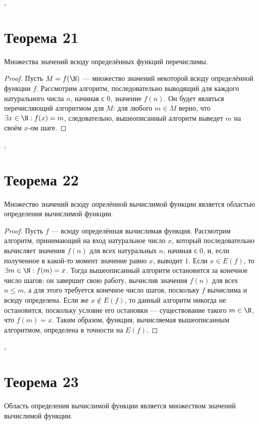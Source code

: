 \documentclass[a4paper,12pt]{article}
\begin{document}
    \sep
    
    \section {Теорема 21}
    \begin{theorem}
    Множества значений всюду определённых функций перечислимы.
    \end{theorem}
    \begin{proof} 
    Пусть $M=f(\N)$ --- множество значений некоторой всюду определённой функции $f$. Рассмотрим алгоритм, последовательно выводящий для каждого натурального числа $n$, начиная с $0$, значение $f(n)$. Он будет являться перечисляющий алгоритмом для $M$: для любого $m\in M$ верно, что $\exists x \in \N : f(x) = m$, следовательно, вышеописанный алгоритм выведет $m$ на своём $x$-ом шаге.
    \end{proof}
	
	\sep
    
    \section {Теорема 22}
    \begin{theorem}
    Множество значений всюду опрелённой вычислимой функции является областью определения вычислимой функции.
    \end{theorem} 
    \begin{proof} Пусть $f$ --- всюду определённая вычислимая функция. Рассмотрим алгоритм, принимающий на вход натуральное число $x$, который последовательно вычисляет значения $f(n)$ для всех натуральных $n$, начиная с $0$, и, если полученное в какой-то момент значение равно $x$, выводит $1$. Если $x\in E(f)$, то $\exists m \in \N : f(m) = x$. Тогда вышеописанный алгоритм остановится за конечное число шагов: он завершит свою работу, вычислив значения $f(n)$ для всех $n\leqslant m$, а для этого требуется конечное число шагов, поскольку $f$ вычислима и всюду определена. Если же $x\not\in E(f)$, то данный алгоритм никогда не остановится, поскольку условие его остановки --- существование такого $m\in\N$, что $f(m)=x$. Таким образом, функция, вычисляемая вышеописанным алгоритмом, определена в точности на $E(f)$.
    \end{proof}
	
	\sep
    \section {Теорема 23}
    \begin{theorem}
        Область определения вычислимой функции является множеством значений вычислимой функции.
    \end{theorem}
    
\end{document}
